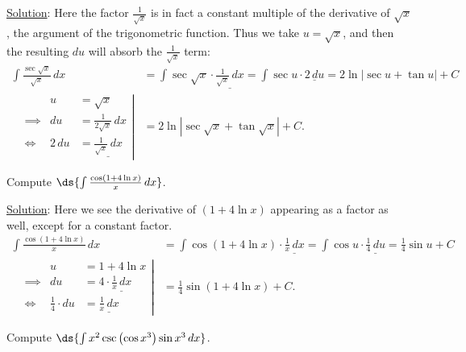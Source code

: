 \underline{Solution}: Here the factor $\frac{1}{\sqrt{x}}$
is in fact a constant multiple of the derivative of 
$\sqrt{x}$, the argument of the trigonometric function.
Thus we take $u=\sqrt{x}$, and then the resulting $du$ will
absorb the $\frac1{\sqrt{x}}$ term:
\begin{align*}
\int\frac{\sec\sqrt{x}}{\sqrt x}\,dx&=
  \int\sec\sqrt{x}\cdot\underline{\frac1{\sqrt{x}}\,dx}
  =\int \sec u\cdot\underline{2\,du}
  =2\ln|\sec u+\tan u|+C\\
\left.\begin{alignedat}{2}
&        &u&=\sqrt x\\
&\implies&du&=\frac1{2\sqrt{x}}\,dx\\
&\iff &2\,du&=\underline{\frac1{\sqrt{x}}\,dx}\end{alignedat}\right|
&=2\ln\left|\sec\sqrt{x}+\tan\sqrt{x}\right|+C.
\end{align*}
\eex

\bex Compute $\ds{\int\frac{\cos(1+4\ln x)}{x}\,dx}$.

\underline{Solution}: Here we see the derivative of $(1+4\ln x)$ appearing
as a factor as well, except for a constant factor.
\begin{align*}
\int\frac{\cos(1+4\ln x)}{x}\,dx&=\int\cos(1+4\ln x)\cdot
               \underline{\frac1x\,dx}
               =\int\cos u\cdot\underline{\frac14\,du}=\frac14\sin u+C\\
\left.\begin{alignedat}{2}
&         &u&=1+4\ln x\\
&\implies&du&=4\cdot\underline{\frac1x\,dx}\\
&\iff&\frac14\cdot du&=\underline{\frac1x\,dx}
\end{alignedat}\right|
&=\frac14\sin(1+4\ln x)+C.\end{align*}
\eex

\bex Compute $\ds{\int x^2\csc\left(\cos x^3\right)\sin x^3\,dx}$.

